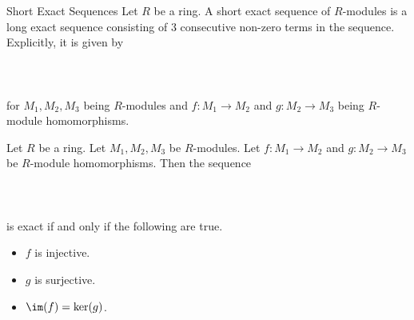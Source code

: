 \documentclass[a4paper]{article}
\begin{document}
\begin{defn}{Short Exact Sequences}{} Let $R$ be a ring. A short exact sequence of $R$-modules is a long exact sequence consisting of $3$ consecutive non-zero terms in the sequence. Explicitly, it is given by \\~\\
\\~\\
for $M_1,M_2,M_3$ being $R$-modules and $f:M_1\to M_2$ and $g:M_2\to M_3$ being $R$-module homomorphisms. 
\end{defn}

\begin{lmm}{}{} Let $R$ be a ring. Let $M_1,M_2,M_3$ be $R$-modules. Let $f:M_1\to M_2$ and $g:M_2\to M_3$ be $R$-module homomorphisms. Then the sequence \\~\\
\\~\\
is exact if and only if the following are true. 
\begin{itemize}
\item $f$ is injective. 
\item $g$ is surjective. 
\item $\im(f)=\ker(g)$. 
\end{itemize}
\end{lmm}
\end{document}
